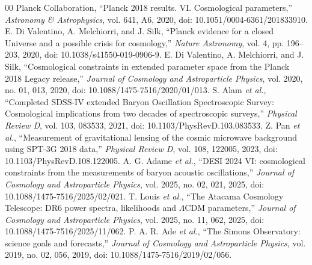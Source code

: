 \documentclass[conference]{IEEEtran}
\begin{document}
\begin{thebibliography}{00}
 Planck Collaboration, ``Planck 2018 results. VI. Cosmological parameters,'' \emph{Astronomy \& Astrophysics}, vol. 641, A6, 2020, doi: 10.1051/0004-6361/201833910.
 E. Di Valentino, A. Melchiorri, and J. Silk, ``Planck evidence for a closed Universe and a possible crisis for cosmology,'' \emph{Nature Astronomy}, vol. 4, pp. 196--203, 2020, doi: 10.1038/s41550-019-0906-9.
 E. Di Valentino, A. Melchiorri, and J. Silk, ``Cosmological constraints in extended parameter space from the Planck 2018 Legacy release,'' \emph{Journal of Cosmology and Astroparticle Physics}, vol. 2020, no. 01, 013, 2020, doi: 10.1088/1475-7516/2020/01/013.
 S. Alam \emph{et al.}, ``Completed SDSS-IV extended Baryon Oscillation Spectroscopic Survey: Cosmological implications from two decades of spectroscopic surveys,'' \emph{Physical Review D}, vol. 103, 083533, 2021, doi: 10.1103/PhysRevD.103.083533.
 Z. Pan \emph{et al.}, ``Measurement of gravitational lensing of the cosmic microwave background using SPT-3G 2018 data,'' \emph{Physical Review D}, vol. 108, 122005, 2023, doi: 10.1103/PhysRevD.108.122005.
 A. G. Adame \emph{et al.}, ``DESI 2024 VI: cosmological constraints from the measurements of baryon acoustic oscillations,'' \emph{Journal of Cosmology and Astroparticle Physics}, vol. 2025, no. 02, 021, 2025, doi: 10.1088/1475-7516/2025/02/021.
 T. Louis \emph{et al.}, ``The Atacama Cosmology Telescope: DR6 power spectra, likelihoods and $\Lambda$CDM parameters,'' \emph{Journal of Cosmology and Astroparticle Physics}, vol. 2025, no. 11, 062, 2025, doi: 10.1088/1475-7516/2025/11/062.
 P. A. R. Ade \emph{et al.}, ``The Simons Observatory: science goals and forecasts,'' \emph{Journal of Cosmology and Astroparticle Physics}, vol. 2019, no. 02, 056, 2019, doi: 10.1088/1475-7516/2019/02/056.
\end{thebibliography}
\end{document}
